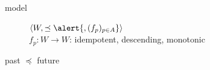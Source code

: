 \documentclass[slidestop,compress,mathserif]{beamer}
\begin{document}
 \begin{frame}
\begin{description}
 \item[model] $\tuple{W, \preceq\alert{, (f_p)_{p\in A}}}$ \\
	    \alert{$f_p\colon W\rightarrow W$: idempotent, descending, monotonic}
\end{description}
 \vfill
\hfil past \quad $\preceq$ \quad future \hfill\\
\vfill
{}

\end{frame}
\end{document}
